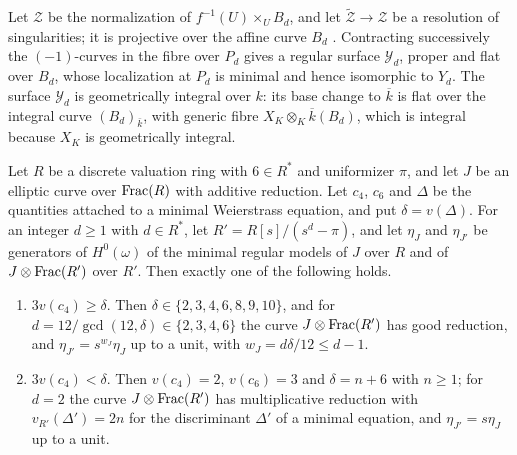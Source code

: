 Let $\mathcal Z$ be the normalization of $f^{-1}(U)\times_UB_d$, and let $\widetilde{\mathcal Z}\to\mathcal Z$ be a resolution of singularities; it is projective over the affine curve $B_d$ \cite[Tag~]{Stacks}.
Contracting successively the $(-1)$-curves in the fibre over $P_d$ gives a regular surface $\mathcal Y_d$, proper and flat over $B_d$, whose localization at $P_d$ is minimal and hence isomorphic to $Y_d$.
The surface $\mathcal Y_d$ is geometrically integral over $k$: its base change to $\overline k$ is flat over the integral curve $(B_d)_{\bar k}$, with generic fibre $X_K\otimes_K\overline k(B_d)$, which is integral because $X_K$ is geometrically integral.

\begin{lemma}\label{lem:weierstrass}
Let $R$ be a discrete valuation ring with $6\in R^*$ and uniformizer $\pi$, and let $J$ be an elliptic curve over $\operatorname{Frac}(R)$ with additive reduction.
Let $c_4$, $c_6$ and $\Delta$ be the quantities attached to a minimal Weierstrass equation, and put $\delta = v(\Delta)$.
For an integer $d\geq 1$ with $d\in R^*$, let $R' = R[s]/(s^d-\pi)$, and let $\eta_J$ and $\eta_{J'}$ be generators of $H^0(\omega)$ of the minimal regular models of $J$ over $R$ and of $J\otimes\operatorname{Frac}(R')$ over $R'$.
Then exactly one of the following holds.
\begin{enumerate}
\item $3v(c_4)\geq\delta$.
  Then $\delta\in\{2,3,4,6,8,9,10\}$, and for $d = 12/\gcd(12,\delta)\in\{2,3,4,6\}$ the curve $J\otimes\operatorname{Frac}(R')$ has good reduction, and $\eta_{J'} = s^{w_J}\eta_J$ up to a unit, with $w_J = d\delta/12\leq d-1$.
\item $3v(c_4)<\delta$.
  Then $v(c_4) = 2$, $v(c_6) = 3$ and $\delta = n+6$ with $n\geq 1$; for $d = 2$ the curve $J\otimes\operatorname{Frac}(R')$ has multiplicative reduction with $v_{R'}(\Delta') = 2n$ for the discriminant $\Delta'$ of a minimal equation, and $\eta_{J'} = s\eta_J$ up to a unit.
\end{enumerate}
\end{lemma}

